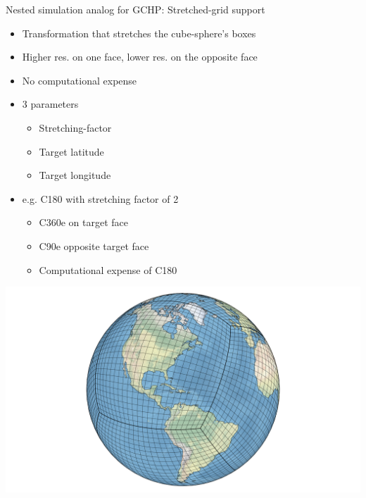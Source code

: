 \documentclass[10pt]{beamer}
\begin{document}
\begin{frame}[fragile]{Nested simulation analog for GCHP: Stretched-grid support}
    \begin{minipage}[c]{0.5\textwidth}
        \footnotesize
        \begin{itemize}
            \item Transformation that stretches the cube-sphere's boxes
            \item Higher res. on one face, lower res. on the opposite face
            \item No computational expense
            \item 3 parameters
            \begin{itemize}
                \footnotesize
                \item Stretching-factor
                \item Target latitude
                \item Target longitude
            \end{itemize}
            \item e.g. C180 with stretching factor of 2
            \begin{itemize}
                \footnotesize
                \item C360e on target face
                \item C90e opposite target face
                \item Computational expense of C180
            \end{itemize}
        \end{itemize}
    \end{minipage}
    \begin{minipage}[c]{0.48\textwidth}
        \begin{center}
            \includegraphics[height=0.3\textheight]{scs_1.png}

\end{center}
\end{minipage}
\end{frame}
\end{document}
